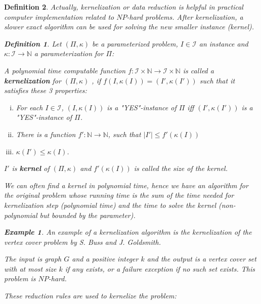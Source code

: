 \documentclass[12pt]{article}
\theoremstyle{slplain}
\newtheorem{defi}{Definition}
\newtheorem{exam}{Example}
\begin{document}
\begin{defi}
Actually, kernelization or data reduction is helpful in practical computer implementation related to $NP$-hard problems. After kernelization, a slower exact algorithm can be used for solving the new smaller instance (kernel).

\begin{defi}
Let $(\Pi, \kappa)$ be a parameterized problem, $I\in\mathcal{I}$ an instance and $\kappa: \mathcal{I} \to \mathbb{N}$ a parameterization for $\Pi$:

A polynomial time computable function $f : \mathcal{I} \times \mathbb{N} \to \mathcal{I} \times \mathbb{N}$ is called a
{\bf kernelization} for $(\Pi, \kappa)$ , if $f(I, \kappa(I)) = (I', \kappa(I'))$ such that it satisfies these 3 properties:

\begin{enumerate}[(i)]
\item For each $I \in \mathcal{I}$, $(I, \kappa(I))$ is a "YES"-instance of $\Pi$ iff $(I', \kappa(I'))$ is a "YES"-instance of $\Pi$.

\item There is a function $f': \mathbb{N} \to \mathbb{N}$, such that $|I'| \leq f'(\kappa(I))$

\item $\kappa(I')\leq \kappa(I)$.
\end{enumerate}

$I'$ is {\bf kernel} of $(\Pi, \kappa)$ and $f'(\kappa(I))$ is called the size of the kernel.

\end{defi}




We can often find a kernel in polynomial time, hence we have an algorithm for the original problem whose running time is the sum of the time needed for kernelization step (polynomial time) and the time to solve the kernel (non-polynomial but bounded by the parameter).

\vspace{1cm}
\begin{exam}
An example of a kernelization algorithm is the kernelization of
the vertex cover problem by S. Buss and J. Goldsmith\cite{buss}. 

The input is graph $G$ and a positive integer 
$k$ and the output is a vertex cover set with at most size $k$ if any exists, or
a failure exception if no such set exists. This problem is $NP$-hard. 

These reduction rules are used to kernelize the problem:


\end{exam}
\end{defi}
\end{document}

